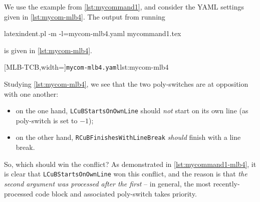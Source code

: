 \begin{example}
 We use the example from \vref{lst:mycommand1}, and consider the YAML settings given in
 \cref{lst:mycom-mlb4}. The output from running   

 \begin{commandshell}
latexindent.pl -m -l=mycom-mlb4.yaml mycommand1.tex
\end{commandshell}

 is given in \cref{lst:mycom-mlb4}.

 \begin{cmhtcbraster}
  [MLB-TCB,width=\linewidth]{\texttt{mycom-mlb4.yaml}}{lst:mycom-mlb4}
 \end{cmhtcbraster}

 Studying \cref{lst:mycom-mlb4}, we see that the two poly-switches are at opposition with
 one another:
 \begin{itemize}
  \item on the one hand, \texttt{LCuBStartsOnOwnLine} should \emph{not} start on its own
        line (as poly-switch is set to $-1$);
  \item on the other hand, \texttt{RCuBFinishesWithLineBreak} \emph{should} finish with a
        line break.
 \end{itemize}
 So, which should win the conflict? As demonstrated in \cref{lst:mycommand1-mlb4}, it is
 clear that \texttt{LCuBStartsOnOwnLine} won this conflict, and the reason is that
 \emph{the second argument was processed after the first} -- in general, the most
 recently-processed code block and associated poly-switch takes priority.
 \end{example}

